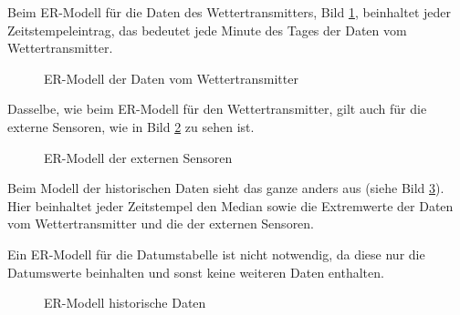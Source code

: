 Beim ER-Modell für die Daten des Wettertransmitters, Bild \ref{img:ER_Modell Wettertransmitter},  beinhaltet jeder Zeitstempeleintrag, das bedeutet jede Minute des Tages der Daten vom Wettertransmitter.

\begin{figure}[h!]
	\centering
	\caption{ER-Modell der Daten vom Wettertransmitter}
	\label{img:ER_Modell Wettertransmitter}
\end{figure}

Dasselbe, wie beim ER-Modell für den Wettertransmitter, gilt auch für die externe Sensoren, wie in Bild \ref{img:ER_Modell externe Sensoren} zu sehen ist.
\begin{figure}[h!]
	\centering
	\caption{ER-Modell der externen Sensoren}
	\label{img:ER_Modell externe Sensoren}
\end{figure}

Beim Modell der historischen Daten sieht das ganze anders aus (siehe Bild \ref{img:ER_Modell historische Daten}). Hier beinhaltet jeder Zeitstempel den Median sowie die Extremwerte der Daten vom Wettertransmitter und die der externen Sensoren.

Ein ER-Modell für die Datumstabelle ist nicht notwendig, da diese nur die Datumswerte beinhalten und sonst keine weiteren Daten enthalten.

\begin{figure}[h!]
	\centering
	\caption{ER-Modell historische Daten}
	\label{img:ER_Modell historische Daten}
\end{figure}

